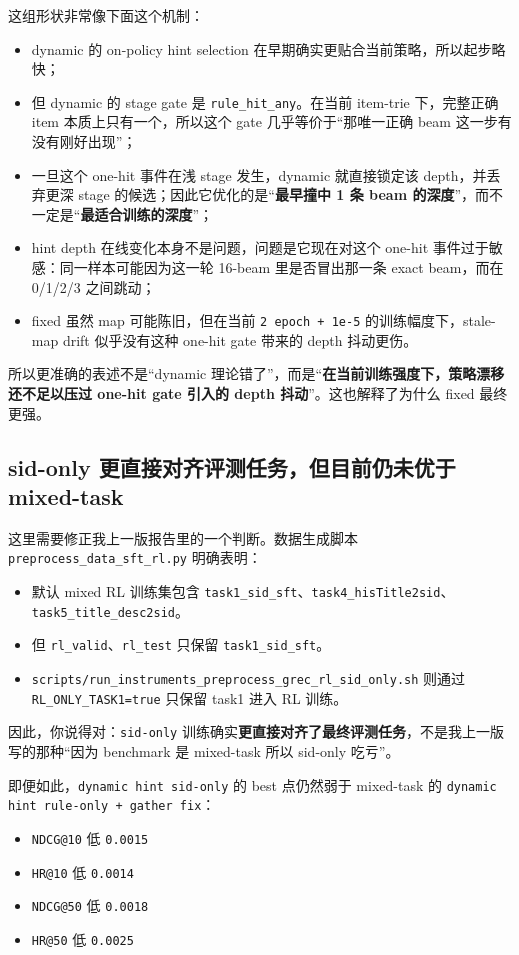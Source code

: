 \documentclass[a4paper]{article}
\begin{document}
这组形状非常像下面这个机制：
\begin{itemize}
\item dynamic 的 on-policy hint selection 在早期确实更贴合当前策略，所以起步略快；
\item 但 dynamic 的 stage gate 是 \texttt{rule\_hit\_any}。在当前 item-trie 下，完整正确 item 本质上只有一个，所以这个 gate 几乎等价于“那唯一正确 beam 这一步有没有刚好出现”；
\item 一旦这个 one-hit 事件在浅 stage 发生，dynamic 就直接锁定该 depth，并丢弃更深 stage 的候选；因此它优化的是“\textbf{最早撞中 1 条 beam 的深度}”，而不一定是“\textbf{最适合训练的深度}”；
\item hint depth 在线变化本身不是问题，问题是它现在对这个 one-hit 事件过于敏感：同一样本可能因为这一轮 16-beam 里是否冒出那一条 exact beam，而在 0/1/2/3 之间跳动；
\item fixed 虽然 map 可能陈旧，但在当前 \texttt{2 epoch + 1e-5} 的训练幅度下，stale-map drift 似乎没有这种 one-hit gate 带来的 depth 抖动更伤。
\end{itemize}

所以更准确的表述不是“dynamic 理论错了”，而是“\textbf{在当前训练强度下，策略漂移还不足以压过 one-hit gate 引入的 depth 抖动}”。这也解释了为什么 fixed 最终更强。

\subsection{sid-only 更直接对齐评测任务，但目前仍未优于 mixed-task}

这里需要修正我上一版报告里的一个判断。数据生成脚本 \texttt{preprocess\_data\_sft\_rl.py} 明确表明：
\begin{itemize}
\item 默认 mixed RL 训练集包含 \texttt{task1\_sid\_sft}、\texttt{task4\_hisTitle2sid}、\texttt{task5\_title\_desc2sid}。
\item 但 \texttt{rl\_valid}、\texttt{rl\_test} 只保留 \texttt{task1\_sid\_sft}。
\item \texttt{scripts/run\_instruments\_preprocess\_grec\_rl\_sid\_only.sh} 则通过 \texttt{RL\_ONLY\_TASK1=true} 只保留 task1 进入 RL 训练。
\end{itemize}

因此，你说得对：\texttt{sid-only} 训练确实\textbf{更直接对齐了最终评测任务}，不是我上一版写的那种“因为 benchmark 是 mixed-task 所以 sid-only 吃亏”。

即便如此，\texttt{dynamic hint sid-only} 的 best 点仍然弱于 mixed-task 的 \texttt{dynamic hint rule-only + gather fix}：
\begin{itemize}
\item \texttt{NDCG@10} 低 \texttt{0.0015}
\item \texttt{HR@10} 低 \texttt{0.0014}
\item \texttt{NDCG@50} 低 \texttt{0.0018}
\item \texttt{HR@50} 低 \texttt{0.0025}
\end{itemize}
\end{document}
